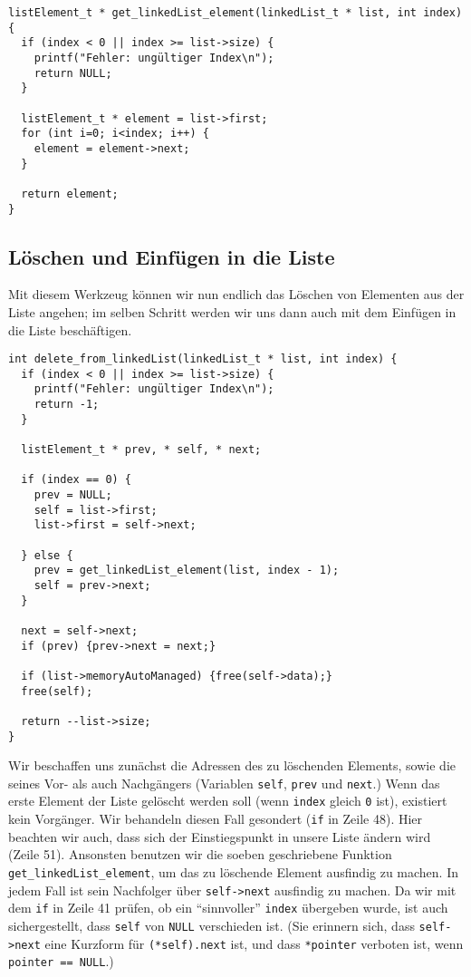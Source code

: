 \begin{codebox}
\begin{verbatim}
listElement_t * get_linkedList_element(linkedList_t * list, int index) {
  if (index < 0 || index >= list->size) {
    printf("Fehler: ungültiger Index\n");
    return NULL;
  }
  
  listElement_t * element = list->first;
  for (int i=0; i<index; i++) {
    element = element->next;
  }
  
  return element;
}
\end{verbatim}
\end{codebox}

\subsection{Löschen und Einfügen in die Liste}
Mit diesem Werkzeug können wir nun endlich das Löschen von Elementen aus der Liste angehen; im selben Schritt werden wir uns dann auch mit dem Einfügen in die Liste beschäftigen.

\begin{codebox}
\begin{verbatim}
int delete_from_linkedList(linkedList_t * list, int index) {
  if (index < 0 || index >= list->size) {
    printf("Fehler: ungültiger Index\n");
    return -1;
  }
  
  listElement_t * prev, * self, * next;
  
  if (index == 0) {
    prev = NULL;
    self = list->first;
    list->first = self->next;
    
  } else {
    prev = get_linkedList_element(list, index - 1);
    self = prev->next;
  }
  
  next = self->next;
  if (prev) {prev->next = next;}
  
  if (list->memoryAutoManaged) {free(self->data);}
  free(self);
  
  return --list->size;
}
\end{verbatim}
\end{codebox}

Wir beschaffen uns zunächst die Adressen des zu löschenden Elements, sowie die seines Vor- als auch Nachgängers (Variablen \texttt{self}, \texttt{prev} und \texttt{next}.) Wenn das erste Element der Liste gelöscht werden soll (wenn \texttt{index} gleich \texttt{0} ist), existiert kein Vorgänger. Wir behandeln diesen Fall gesondert (\texttt{if} in Zeile 48). Hier beachten wir auch, dass sich der Einstiegspunkt in unsere Liste ändern wird (Zeile 51). Ansonsten benutzen wir die soeben geschriebene Funktion \texttt{get\_linkedList\_element}, um das zu löschende Element ausfindig zu machen. In jedem Fall ist sein Nachfolger über \texttt{self->next} ausfindig zu machen. Da wir mit dem \texttt{if} in Zeile 41 prüfen, ob ein \enquote{sinnvoller} \texttt{index} übergeben wurde, ist auch sichergestellt, dass \texttt{self} von \texttt{NULL} verschieden ist. (Sie erinnern sich, dass \texttt{self->next} eine Kurzform für \texttt{(*self).next} ist, und dass \texttt{*pointer} verboten ist, wenn \texttt{pointer == NULL}.)

